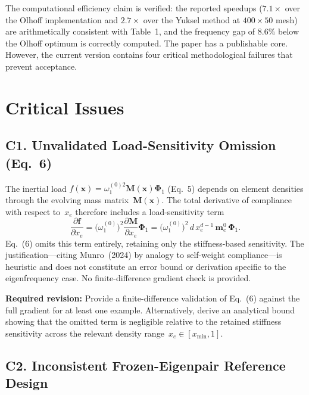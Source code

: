 \documentclass[11pt,a4paper]{article}
\begin{document}
The computational efficiency claim is verified: the reported speedups
($7.1\times$ over the Olhoff implementation and $2.7\times$ over the Yuksel method at
$400\times50$ mesh) are arithmetically consistent with Table~1, and the frequency gap of
$8.6\%$ below the Olhoff optimum is correctly computed. The paper has a publishable core.
However, the current version contains four critical methodological failures that prevent
acceptance.


\section{Critical Issues}

\subsection*{C1.\; Unvalidated Load-Sensitivity Omission (Eq.~6)}

The inertial load $f(\mathbf{x}) = \omega_1^{(0)2} \mathbf{M}(\mathbf{x})\boldsymbol{\Phi}_1$
(Eq.~5) depends on element densities through the evolving mass matrix~$\mathbf{M}(\mathbf{x})$.
The total derivative of compliance with respect to~$x_e$ therefore includes a load-sensitivity
term
\[
  \frac{\partial \mathbf{f}}{\partial x_e}
    = \bigl(\omega_1^{(0)}\bigr)^2 \frac{\partial \mathbf{M}}{\partial x_e}\boldsymbol{\Phi}_1
    = \bigl(\omega_1^{(0)}\bigr)^2\, d\, x_e^{d-1}\, \mathbf{m}_e^0\, \boldsymbol{\Phi}_1.
\]
Eq.~(6) omits this term entirely, retaining only the stiffness-based sensitivity.
The justification---citing Munro~(2024) by analogy to self-weight compliance---is
heuristic and does not constitute an error bound or derivation specific to the
eigenfrequency case. No finite-difference gradient check is provided.

\textbf{Required revision:} Provide a finite-difference validation of Eq.~(6) against
the full gradient for at least one example. Alternatively, derive an analytical bound
showing that the omitted term is negligible relative to the retained stiffness sensitivity
across the relevant density range~$x_e\in[x_{\min},1]$.

\subsection*{C2.\; Inconsistent Frozen-Eigenpair Reference Design}
\end{document}
